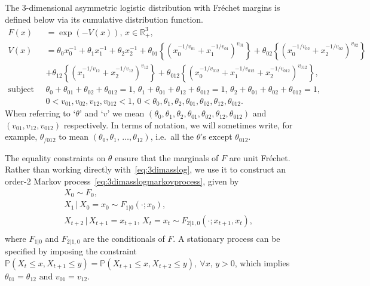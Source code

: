 \documentclass[11pt,twoside,openany]{book}
\newcommand{\prob}{\mathbb{P}}
\newcommand{\R}{\mathbb{R}}
\numberwithin{Theorem}{chapter}
\numberwithin{Definition}{chapter}
\numberwithin{Lemma}{chapter}
\numberwithin{Algorithm}{chapter}
\numberwithin{equation}{chapter}
\begin{document}
The 3-dimensional asymmetric logistic distribution with Fréchet margins is
defined below via its cumulative distribution function.
\begin{equation}
  \label{eq:3dimasslog}
  \begin{split}
  F(x) &= \exp\left(-V(x)\right),\, x \in \R_{+}^3,\\
V(x) &= \theta_0 x_0^{-1} + \theta_1 x_1^{-1} + \theta_2 x_2^{-1}
     +\theta_{01}\left\{(x_0^{-1/v_{01}} + x_1^{-1/v_{01}})^{v_{01}}\right\}
+\theta_{02}\left\{(x_0^{-1/v_{02}} + x_2^{-1/v_{02}})^{v_{02}}\right\}\\
     &+\theta_{12}\left\{ (x_1^{-1/v_{12}} + x_2^{-1/v_{12}})^{v_{12}}\right\}
+\theta_{012}\left\{(x_0^{-1/v_{012}} + x_1^{-1/v_{012}} + x_2^{-1/v_{012}})^{v_{012}}\right\},\\
\text{subject to  }\;
&\theta_0+\theta_{01}+\theta_{02}+\theta_{012}=1,\,
\theta_1+\theta_{01}+\theta_{12}+\theta_{012}=1,\,
\theta_2+\theta_{01}+\theta_{02}+\theta_{012}=1,\\
&0<v_{01},v_{02},v_{12},v_{012} < 1,\,
0<\theta_0,\theta_1,\theta_2,\theta_{01},\theta_{02},\theta_{12},\theta_{012}.
\end{split}
\end{equation}
When referring to `$\theta$' and `$v$' we mean
$(\theta_0,\theta_1,\theta_2,\theta_{01},\theta_{02},\theta_{12},\theta_{012})$
and $(v_{01}, v_{12}, v_{012})$ respectively. In terms of notation,
we will sometimes write, for example, $\theta_{/012}$ to mean $(\theta_0,\theta_1,\,\ldots,\theta_{12})$,
i.e.\ all the $\theta$'s except $\theta_{012}$.

The equality constraints on
$\theta$ ensure that the marginals of $F$ are unit
Fréchet.
Rather than working directly with~\eqref{eq:3dimasslog}, we use it to
construct an order-2 Markov process~\eqref{eq:3dimasslogmarkovprocess}, given by
\begin{equation}\label{eq:3dimasslogmarkovprocess}
  \begin{split}
  &X_{0} \sim F_{0},\\
  &X_{1}\,|\,X_0=x_0 \sim F_{1|0}(\cdot; x_0),\\
  &X_{t+2}\,|\,X_{t+1}=x_{t+1},\,X_t=x_t \sim F_{2|1,0}(\cdot; x_{t+1}, x_t),\\
\end{split}
\end{equation}
where $F_{1|0}$ and $F_{2|1,0}$ are the conditionals of $F$.
A stationary process can be specified by imposing the constraint
$\prob(X_t \leq x,X_{t+1}\leq y) = \prob(X_{t+1} \leq x,X_{t+2}\leq y),\
\forall x,\,y>0$, which implies $\theta_{01} = \theta_{12} \text{ and } v_{01} =
v_{12}$.
\end{document}
